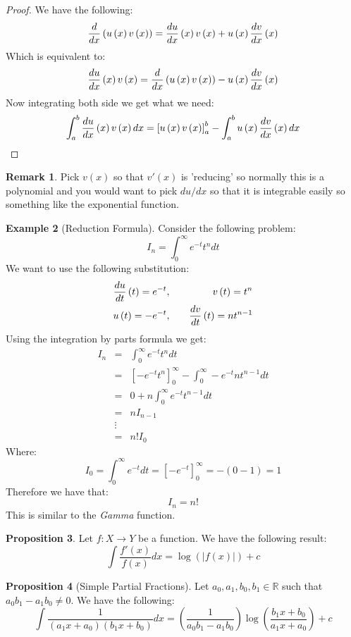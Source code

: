 \documentclass[11pt]{article}
\theoremstyle{definition}
\newtheorem{prop}{Proposition}[section]
\newtheorem{rmk}[prop]{Remark}
\newtheorem{eg}[prop]{Example}
\newcommand{\brac}[1]{\left(#1\right)}
\newcommand{\sqbrac}[1]{\left[#1\right]}
\newcommand{\diff}[2]{\frac{d\ifthenelse{\equal{#1}{}}{}{#1}}{d#2}}
\newcommand{\abs}[1]{\left\lvert#1\right\rvert}
\newcommand{\R}{\mathbb{R}}
\begin{document}
	\begin{proof}
		We have the following:
		$$\diff{}{x}\brac{u\brac{x}v\brac{x}} = \diff{u}{x}\brac{x}v\brac{x} + u\brac{x}\diff{v}{x}\brac{x}$$
		Which is equivalent to:
		$$\diff{u}{x}\brac{x}v\brac{x}  = \diff{}{x}\brac{u\brac{x}v\brac{x}} - u\brac{x}\diff{v}{x}\brac{x}$$
		Now integrating both side we get what we need:
		$$\int_{a}^{b} \diff{u}{x}\brac{x}v\brac{x}dx= \sqbrac{u\brac{x}v\brac{x}}_a^b -\int_{a}^{b}u\brac{x}\diff{v}{x}\brac{x}dx$$
	\end{proof}
	\begin{rmk}
		Pick $v\brac{x}$ so that $v'\brac{x}$ is 'reducing' so normally this is a polynomial and you would want to pick $du/dx$ so that it is integrable easily so something like the exponential function.
	\end{rmk}
	\begin{eg}[Reduction Formula]
		Consider the following problem:
		$$ I_n = \int_{0}^{\infty} e^{-t}t^ndt $$
		We want to use the following substitution:
		\begin{eqnarray*}
			\diff{u}{t}\brac{t} = e^{-t},&&\quad v\brac{t} = t^n\\
			u\brac{t} = -e^{-t},&&\quad \diff{v}{t}\brac{t} = nt^{n-1}
		\end{eqnarray*}
		Using the integration by parts formula we get:
		\begin{eqnarray*}
			I_n &=& \int_{0}^{\infty} e^{-t}t^ndt \\
			&=& \sqbrac{-e^{-t}t^n}_0^{\infty} - \int_{0}^{\infty}-e^{-t}nt^{n-1}dt\\
			&=& 0 + n\int_{0}^{\infty} e^{-t}t^{n-1}dt\\
			&=& n I_{n-1}\\
			&\vdots &\\
			&=& n! I_0
		\end{eqnarray*}
		Where:
		$$ I_0 = \int_{0}^{\infty}e^{-t}dt = \sqbrac{-e^{-t}}_{0}^{\infty} = -\brac{0-1} = 1$$
		Therefore we have that:
		$$ I_n = n!$$
		This is similar to the \emph{Gamma} function. 
	\end{eg}
	\begin{prop}
		Let $f:X\rightarrow Y$ be a function. We have the following result:
		$$\int \frac{f'\brac{x}}{f\brac{x}}dx = \log\brac{\abs{f\brac{x}}} + c$$
	\end{prop}
	\begin{prop}[Simple Partial Fractions]
		Let $a_0,a_1,b_0,b_1\in\R$ such that $a_0b_1-a_1b_0 \neq 0$. We have the following:
		$$ \int\frac{1}{\brac{a_1x + a_0}\brac{b_1x + b_0}}dx = \brac{\frac{1}{a_0b_1-a_1b_0}}\log\brac{\frac{b_1 x + b_0}{a_1 x + a_0}}+c$$
	\end{prop}
\end{document}
